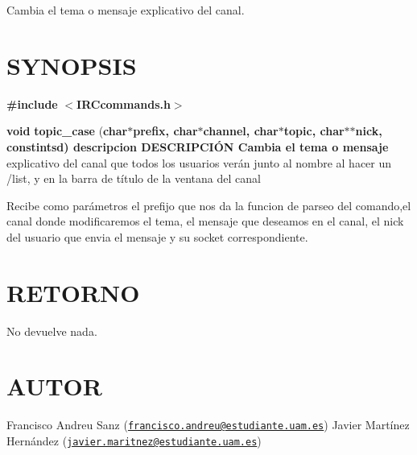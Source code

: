 Cambia el tema o mensaje explicativo del canal.\hypertarget{unknown_case_SYNOPSIS}{}\section{S\-Y\-N\-O\-P\-S\-I\-S}\label{unknown_case_SYNOPSIS}
{\bfseries \#include} {\bfseries $<$I\-R\-Ccommands.\-h$>$} 

{\bfseries void} {\bfseries topic\-\_\-case} {\bfseries }({\bfseries char{\bfseries $\ast${\bfseries prefix{\bfseries },} {\bfseries char{\bfseries $\ast${\bfseries channel{\bfseries },} {\bfseries char{\bfseries $\ast${\bfseries topic{\bfseries },} {\bfseries char{\bfseries $\ast$$\ast${\bfseries nick{\bfseries },} const{\bfseries int{\bfseries sd{\bfseries })}  } } descripcion} D\-E\-S\-C\-R\-I\-P\-C\-IÓ\-N}  Cambia} el} tema} o} mensaje} explicativo del canal que todos los usuarios verán junto al nombre al hacer un /list, y en la barra de título de la ventana del canal

Recibe como parámetros el prefijo que nos da la funcion de parseo del comando,el canal donde modificaremos el tema, el mensaje que deseamos en el canal, el nick del usuario que envia el mensaje y su socket correspondiente.\hypertarget{unknown_case_retorno}{}\section{R\-E\-T\-O\-R\-N\-O}\label{unknown_case_retorno}
No devuelve nada.\hypertarget{unknown_case_authors}{}\section{A\-U\-T\-O\-R}\label{unknown_case_authors}
Francisco Andreu Sanz (\href{mailto:francisco.andreu@estudiante.uam.es}{\tt francisco.\-andreu@estudiante.\-uam.\-es}) Javier Martínez Hernández (\href{mailto:javier.maritnez@estudiante.uam.es}{\tt javier.\-maritnez@estudiante.\-uam.\-es}) 